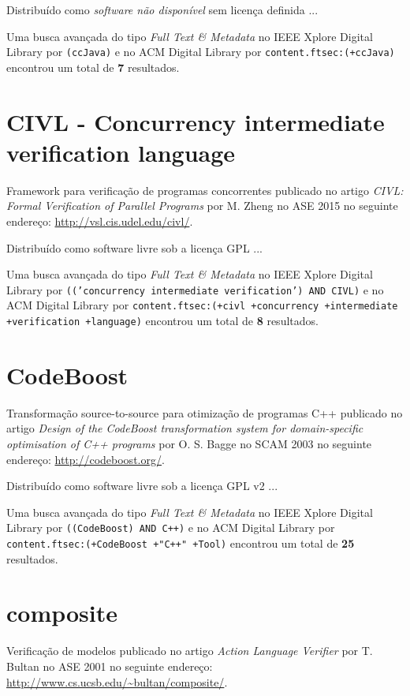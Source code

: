 Distribuído como {\it software não disponível}
sem licença definida ...


Uma busca avançada do tipo {\it Full Text \& Metadata} no IEEE Xplore Digital Library por
\texttt{(ccJava)}
e no ACM Digital Library por
\texttt{content.ftsec:(+ccJava)}
encontrou um total de
{\bf 7}
resultados.

\section{CIVL - Concurrency intermediate verification language}

Framework para verificação de programas concorrentes
publicado no artigo
{\it CIVL: Formal Verification of Parallel Programs}
por
M. Zheng
no
ASE
2015
no seguinte endereço:
\url{http://vsl.cis.udel.edu/civl/}.

Distribuído como software livre
sob a licença GPL ...


Uma busca avançada do tipo {\it Full Text \& Metadata} no IEEE Xplore Digital Library por
\texttt{(('concurrency intermediate verification') AND CIVL)}
e no ACM Digital Library por
\texttt{content.ftsec:(+civl +concurrency +intermediate +verification +language)}
encontrou um total de
{\bf 8}
resultados.

\section{CodeBoost}

Transformação source-to-source para otimização de programas C++
publicado no artigo
{\it Design of the CodeBoost transformation system for domain-specific optimisation of C++ programs}
por
O. S. Bagge
no
SCAM
2003
no seguinte endereço:
\url{http://codeboost.org/}.

Distribuído como software livre
sob a licença GPL v2 ...


Uma busca avançada do tipo {\it Full Text \& Metadata} no IEEE Xplore Digital Library por
\texttt{((CodeBoost) AND C++)}
e no ACM Digital Library por
\texttt{content.ftsec:(+CodeBoost +"C++" +Tool)}
encontrou um total de
{\bf 25}
resultados.

\section{composite}

Verificação de modelos
publicado no artigo
{\it Action Language Verifier}
por
T. Bultan
no
ASE
2001
no seguinte endereço:
\url{http://www.cs.ucsb.edu/~bultan/composite/}.

